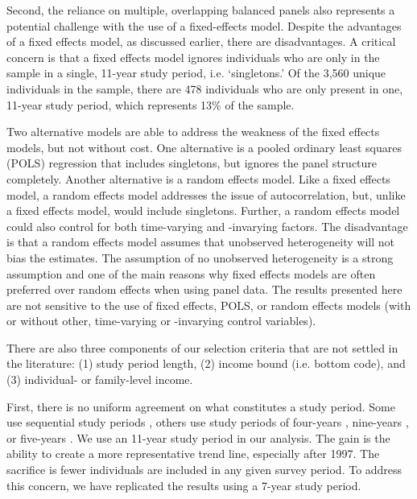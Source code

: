 \documentclass[12pt]{article}
\begin{document}
Second, the reliance on multiple, overlapping balanced panels also represents a potential challenge with the use of a fixed-effects model. Despite the advantages of a fixed effects model, as discussed earlier, there are disadvantages. A critical concern is that a fixed effects model ignores individuals who are only in the sample in a single, 11-year study period, i.e. `singletons.' Of the 3,560 unique individuals in the sample, there are 478 individuals who are only present in one, 11-year study period, which represents 13\% of the sample. 

Two alternative models are able to address the weakness of the fixed effects models, but not without cost.  One alternative is a pooled ordinary least squares (POLS) regression that includes singletons, but ignores the panel structure completely.  Another alternative is a random effects model. Like a fixed effects model, a random effects model addresses the issue of autocorrelation, but, unlike a fixed effects model, would include singletons. Further, a random effects model could also control for both time-varying and -invarying factors. The disadvantage is that a random effects model assumes that unobserved heterogeneity will not bias the estimates. The assumption of no unobserved heterogeneity is a strong assumption and one of the main reasons why fixed effects models are often preferred over random effects when using panel data. The results presented here are not sensitive to the use of fixed effects, POLS, or random effects models (with or without other, time-varying or -invarying control variables). 

There are also three components of our selection criteria that are not settled in the literature: (1) study period length, (2) income bound (i.e. bottom code), and (3) individual- or family-level income. 

First, there is no uniform agreement on what constitutes a study period. Some use sequential study periods \citep{dynan_etal_2012,shin_solon_2011,nichols_rehm_2014}, others use study periods of four-years \citep{hacker_2006}, nine-years \citep{gottschalk_moffitt_2009}, or five-years \citep{gottschalk_moffitt_1994}. We use an 11-year study period in our analysis. The gain is the ability to create a more representative trend line, especially after 1997. The sacrifice is fewer individuals are included in any given survey period. To address this concern, we have replicated the results using a 7-year study period. 
\end{document}
